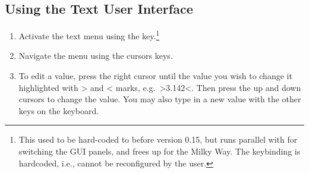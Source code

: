 \subsection{Using the Text User Interface}
\label{sec:plugins:TUI:using}

\begin{enumerate}
\item Activate the text menu using the  key.\footnote{This
    used to be hard-coded to  before version 0.15, but
     runs parallel with  for switching the GUI
    panels, and frees up  for the Milky Way. The 
    keybinding is hardcoded, i.e., cannot be reconfigured by the
    user.}
\item
  Navigate the menu using the cursors keys.
\item
  To edit a value, press the right cursor until the value you wish to
  change it highlighted with \textgreater{} and \textless{} marks, e.g.\
  \textgreater{}3.142\textless{}. Then press the up and down cursors to
  change the value. You may also type in a new value with the other keys
  on the keyboard.
\end{enumerate}

